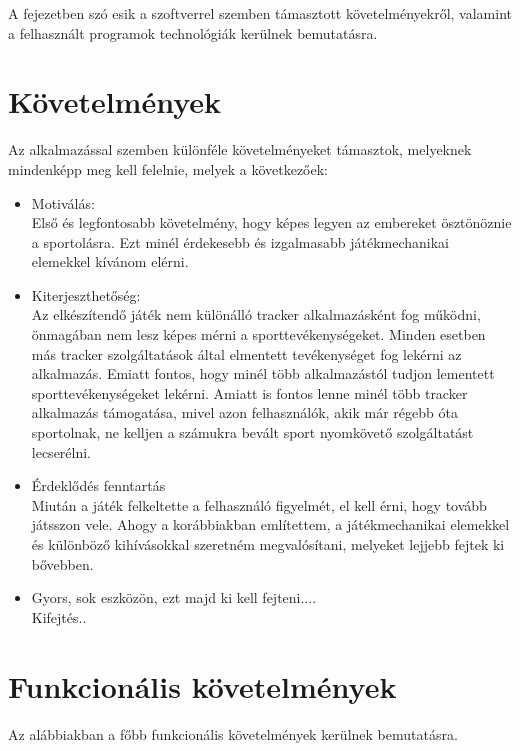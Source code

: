 
A fejezetben szó esik a szoftverrel szemben támasztott követelményekről, valamint a felhasznált programok technológiák kerülnek bemutatásra. 

\section{Követelmények}
\label{resz3_1}

Az alkalmazással szemben különféle követelményeket támasztok, melyeknek mindenképp meg kell felelnie, melyek a következőek:

\begin{itemize}
	\item Motiválás:
	\\
	Első és legfontosabb követelmény, hogy képes legyen az embereket ösztönöznie a sportolásra. Ezt minél érdekesebb és izgalmasabb játékmechanikai elemekkel kívánom elérni.
	\item Kiterjeszthetőség:
	\\
	Az elkészítendő játék nem különálló tracker alkalmazásként fog működni, önmagában nem lesz képes mérni a sporttevékenységeket. Minden esetben más tracker szolgáltatások által elmentett tevékenységet fog lekérni az alkalmazás. Emiatt fontos, hogy minél több alkalmazástól tudjon lementett sporttevékenységeket lekérni. Amiatt is fontos lenne minél több tracker alkalmazás támogatása, mivel azon felhasználók, akik már régebb óta sportolnak, ne kelljen a számukra bevált sport nyomkövető szolgáltatást lecserélni.
	\item Érdeklődés fenntartás
	\\
	Miután a játék felkeltette a felhasználó figyelmét, el kell érni, hogy tovább játsszon vele. Ahogy a korábbiakban említettem, a játékmechanikai elemekkel és különböző kihívásokkal szeretném megvalósítani, melyeket lejjebb fejtek ki bővebben.

	\item Gyors, sok eszközön, ezt majd ki kell fejteni....
	\\
	Kifejtés..
\end{itemize}


\section*{Funkcionális követelmények}
\label{resz3_1_1}

Az alábbiakban a főbb funkcionális követelmények kerülnek bemutatásra.

